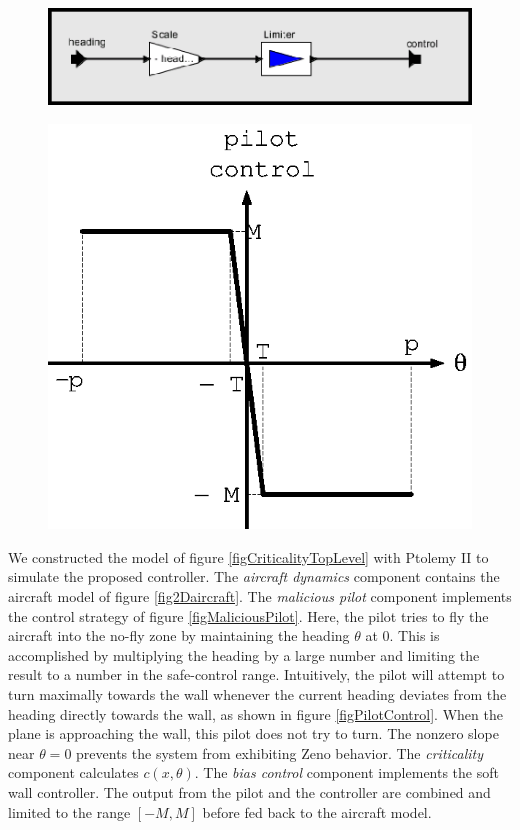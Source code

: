 \documentclass[11pt]{article}
\begin{document}
\begin{figure}[btp]
\centering
\includegraphics{maliciousPilot.eps}
\end{figure}

\begin{figure}[btp]
\centering
\includegraphics{pilotControl.eps}
\end{figure}

We constructed the model of figure \ref{figCriticalityTopLevel} with
Ptolemy II to simulate the proposed controller. The \emph{aircraft
dynamics} component contains the aircraft model of figure
\ref{fig2Daircraft}. The \emph{malicious pilot} component implements
the control strategy of figure \ref{figMaliciousPilot}. Here, the
pilot tries to fly the aircraft into the no-fly zone by maintaining
the heading $\theta$ at 0. This is accomplished by multiplying the
heading by a large number and limiting the result to a number in the
safe-control range.  Intuitively, the pilot will attempt to turn
maximally towards the wall whenever the current heading deviates from
the heading directly towards the wall, as shown in figure
\ref{figPilotControl}.  When the plane is approaching the wall, this
pilot does not try to turn.  The nonzero slope near $\theta = 0$
prevents the system from exhibiting Zeno behavior.  The
\emph{criticality} component calculates $c(x, \theta)$. The \emph{bias
control} component implements the soft wall controller. The output
from the pilot and the controller are combined and limited to the
range $[-M, M]$ before fed back to the aircraft model.
\end{document}

